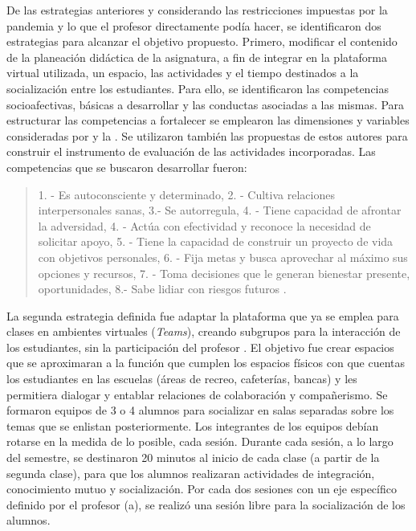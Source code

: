 \documentclass[spanish]{textolivre}
\begin{document}
De las estrategias anteriores y considerando las restricciones impuestas por la pandemia y lo que el profesor directamente podía hacer, se identificaron dos estrategias para alcanzar el objetivo propuesto. Primero, modificar el contenido de la planeación didáctica de la asignatura, a fin de integrar en la plataforma virtual utilizada, un espacio, las actividades y el tiempo destinados a la socialización entre los estudiantes. Para ello, se identificaron las competencias socioafectivas, básicas a desarrollar \cite{mikulic2015} y las conductas asociadas a las mismas. Para estructurar las competencias a fortalecer se emplearon las dimensiones y variables consideradas por \textcite{mikulic2015} y la \textcite{secretaria2018}. Se utilizaron también las propuestas de estos autores para construir el instrumento de evaluación de las actividades incorporadas. Las competencias que se buscaron desarrollar fueron: 

\begin{quote}
1. - Es autoconsciente y determinado, 2. - Cultiva relaciones interpersonales sanas, 3.- Se autorregula, 4. - Tiene capacidad de afrontar la adversidad, 4. - Actúa con efectividad y reconoce la necesidad de solicitar apoyo, 5. - Tiene la capacidad de construir un proyecto de vida con objetivos personales, 6. - Fija metas y busca aprovechar al máximo sus opciones y recursos, 7. - Toma decisiones que le generan bienestar presente, oportunidades, 8.- Sabe lidiar con riesgos futuros \cite[p. 11]{secretaria2018}.
\end{quote}

La segunda estrategia definida fue adaptar la plataforma que ya se emplea para clases en ambientes virtuales (\emph{Teams}), creando subgrupos para la interacción de los estudiantes, sin la participación del profesor \cite{huertacuervo2020}. El objetivo fue crear espacios que se aproximaran a la función que cumplen los espacios físicos con que cuentas los estudiantes en las escuelas (áreas de recreo, cafeterías, bancas) y les permitiera dialogar y entablar relaciones de colaboración y compañerismo. Se formaron equipos de 3 o 4 alumnos para socializar en salas separadas sobre los temas que se enlistan posteriormente. Los integrantes de los equipos debían rotarse en la medida de lo posible, cada sesión. Durante cada sesión, a lo largo del semestre, se destinaron 20 minutos al inicio de cada clase (a partir de la segunda clase), para que los alumnos realizaran actividades de integración, conocimiento mutuo y socialización. Por cada dos sesiones con un eje específico definido por el profesor (a), se realizó una sesión libre para la socialización de los alumnos. 
\end{document}
